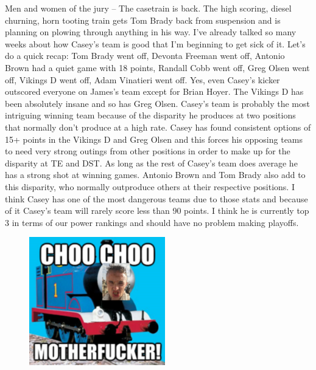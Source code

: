 \documentclass[11pt,letterpaper]{article}
\begin{document}
\newpage
{}
\par\noindent Men and women of the jury – The casetrain is back. The high scoring, diesel churning, horn tooting train gets Tom Brady back from suspension and is planning on plowing through anything in his way. I've already talked so many weeks about how Casey's team is good that I'm beginning to get sick of it. Let's do a quick recap: Tom Brady went off, Devonta Freeman went off, Antonio Brown had a quiet game with 18 points, Randall Cobb went off, Greg Olsen went off, Vikings D went off, Adam Vinatieri went off. Yes, even Casey's kicker outscored everyone on James's team except for Brian Hoyer. The Vikings D has been absolutely insane and so has Greg Olsen. Casey's team is probably the most intriguing winning team because of the disparity he produces at two positions that normally don't produce at a high rate. Casey has found consistent options of 15+ points in the Vikings D and Greg Olsen and this forces his opposing teams to need very strong outings from other positions in order to make up for the disparity at TE and DST. As long as the rest of Casey's team does average he has a strong shot at winning games. Antonio Brown and Tom Brady also add to this disparity, who normally outproduce others at their respective positions. I think Casey has one of the most dangerous teams due to those stats and because of it Casey's team will rarely score less than 90 points. I think he is currently top 3 in terms of our power rankings and should have no problem making playoffs.
\begin{figure}
\centering
\includegraphics[width=0.525\textwidth]{week5-choochoo.png}
\label{fig:week5-choochoo}
\end{figure}
\bigskip
\end{document}
